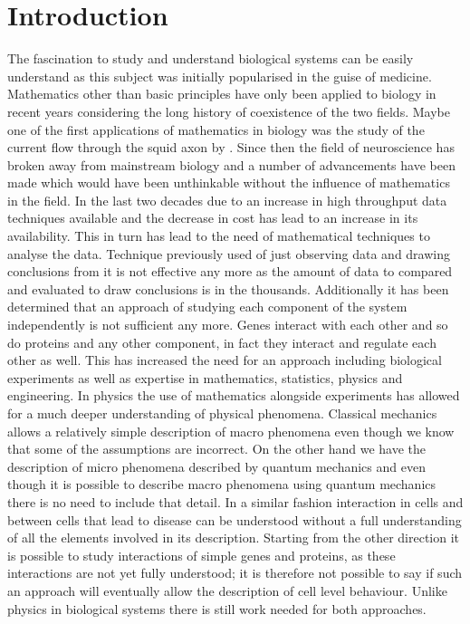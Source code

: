 \chapter{Introduction}
\label{cha:introduction}

The fascination to study and understand biological systems can be easily understand as this subject was initially popularised in the guise of medicine. Mathematics other than basic principles have only been applied to biology in recent years considering the long history of coexistence of the two fields. Maybe one of the first applications of mathematics in biology was the study of the current flow through the squid axon by \cite{Hodgkin:1952td}. Since then the field of neuroscience has broken away from mainstream biology and a number of advancements have been made which would have been unthinkable without the influence of mathematics in the field. In the last two decades due to an increase in high throughput data techniques available and the decrease in cost has lead to an increase in its availability. This in turn has lead to the need of mathematical techniques to analyse the data. Technique previously used of just observing data and drawing conclusions from it is not effective any more as the amount of data to compared and evaluated to draw conclusions is in the thousands. Additionally it has been determined that an approach of studying each component of the system independently is not sufficient any more. Genes interact with each other and so do proteins and any other component, in fact they interact and regulate each other as well. This has increased the need for an approach including biological experiments as well as expertise in mathematics, statistics, physics and engineering. In physics the use of mathematics alongside experiments has allowed for a much deeper understanding of physical phenomena. Classical mechanics allows a relatively simple description of macro phenomena even though we know that some of the assumptions are incorrect. On the other hand we have the description of micro phenomena described by quantum mechanics and even though it is possible to describe macro phenomena using quantum mechanics there is no need to include that detail. In a similar fashion interaction in cells and between cells that lead to disease can be understood without a full understanding of all the elements involved in its description. Starting from the other direction it is possible to study interactions of simple genes and proteins, as these interactions are not yet fully understood; it is therefore not possible to say if such an approach will eventually allow the description of cell level behaviour. Unlike physics in biological systems there is still work needed for both approaches.

